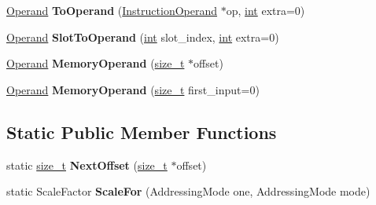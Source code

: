 \begin{DoxyCompactItemize}
\mbox{\hyperlink{classv8_1_1internal_1_1Operand}{Operand}} {\bfseries To\+Operand} (\mbox{\hyperlink{classv8_1_1internal_1_1compiler_1_1InstructionOperand}{Instruction\+Operand}} $\ast$op, \mbox{\hyperlink{classint}{int}} extra=0)
\item 
\mbox{\label{classv8_1_1internal_1_1compiler_1_1X64OperandConverter_a8b94e0e0eb911d5ef28ec6952b6337f3}} 
\mbox{\hyperlink{classv8_1_1internal_1_1Operand}{Operand}} {\bfseries Slot\+To\+Operand} (\mbox{\hyperlink{classint}{int}} slot\+\_\+index, \mbox{\hyperlink{classint}{int}} extra=0)
\item 
\mbox{\label{classv8_1_1internal_1_1compiler_1_1X64OperandConverter_a9aca54539686848edaebff0f65a4db0d}} 
\mbox{\hyperlink{classv8_1_1internal_1_1Operand}{Operand}} {\bfseries Memory\+Operand} (\mbox{\hyperlink{classsize__t}{size\+\_\+t}} $\ast$offset)
\item 
\mbox{\label{classv8_1_1internal_1_1compiler_1_1X64OperandConverter_aa935da453c62493798e8eef04731932e}} 
\mbox{\hyperlink{classv8_1_1internal_1_1Operand}{Operand}} {\bfseries Memory\+Operand} (\mbox{\hyperlink{classsize__t}{size\+\_\+t}} first\+\_\+input=0)
\end{DoxyCompactItemize}
\subsection*{Static Public Member Functions}
\begin{DoxyCompactItemize}
\item 
\mbox{\label{classv8_1_1internal_1_1compiler_1_1X64OperandConverter_ac3c0d6ddc701962daffed262f2149cb9}} 
static \mbox{\hyperlink{classsize__t}{size\+\_\+t}} {\bfseries Next\+Offset} (\mbox{\hyperlink{classsize__t}{size\+\_\+t}} $\ast$offset)
\item 
\mbox{\label{classv8_1_1internal_1_1compiler_1_1X64OperandConverter_a77fc33a8abe1736b250d26e9d75efb28}} 
static Scale\+Factor {\bfseries Scale\+For} (Addressing\+Mode one, Addressing\+Mode mode)
\end{DoxyCompactItemize}
